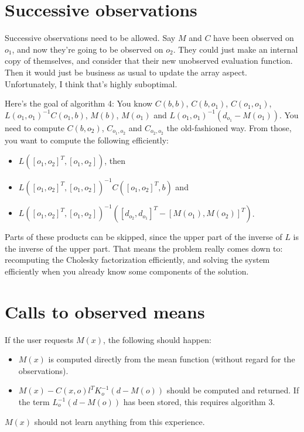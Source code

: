 \documentclass{manual}
\begin{document}
\begin{itemize}
\section{Successive observations}\label{sec:succObs}
Successive observations need to be allowed. Say $M$ and $C$ have been observed on $o_1$, and now they're going to be observed on $o_2$. They could just make an internal copy of themselves, and consider that their new unobserved evaluation function. Then it would just be business as usual to update the array aspect. Unfortunately, I think that's highly suboptimal. 

Here's the goal of algorithm 4: You know $C(b,b)$, $C(b,o_1)$, $C(o_1,o_1)$, $L(o_1,o_1)^{-1}C(o_1,b)$, $M(b)$, $M(o_1)$ and $L(o_1,o_1)^{-1}(d_{o_1} - M(o_1))$. You need to compute $C(b,o_2)$, $C_{o_1,o_2}$ and $C_{o_2,o_2}$ the old-fashioned way. From those, you want to compute the following efficiently:
\begin{itemize}
	\item $L([o_1,o_2]^T,[o_1,o_2])$, then
	\item $L([o_1,o_2]^T,[o_1,o_2])^{-1} C([o_1,o_2]^T,b)$ and
	\item $L([o_1,o_2]^T,[o_1,o_2])^{-1} ([d_{o_2}, d_{o_1}]^T - [M(o_1), M(o_2)]^T)$.
\end{itemize}
Parts of these products can be skipped, since the upper part of the inverse of $L$ is the inverse of the upper part. That means the problem really comes down to: recomputing the Cholesky factorization efficiently, and solving the system efficiently when you already know some components of the solution.

\section{Calls to observed means}\label{sec:obsMeanCalls} 
If the user requests $M(x)$, the following should happen:
\begin{itemize}
	\item $M(x)$ is computed directly from the mean function (without regard for the observations).
	\item $M(x) - C(x,o) l^T K_o^{-1} (d-M(o))$ should be computed and returned. If the term $L_o^{-1}(d-M(o))$ has been stored, this requires algorithm 3.
\end{itemize}
$M(x)$ should not learn anything from this experience.


\end{itemize}
\end{document}
